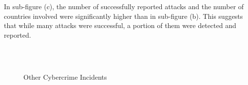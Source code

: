 	In sub-figure (c), the number of successfully reported attacks and the number of countries involved were significantly higher than in sub-figure (b).
	This suggests that while many attacks were successful, a portion of them were detected and reported.
	\begin{figure}[htbp]
		\centering
		\\
		\hfill
		\\
		\caption{Other Cybercrime Incidents}\label{fig:other-cybercrime-incidents}
	\end{figure}
